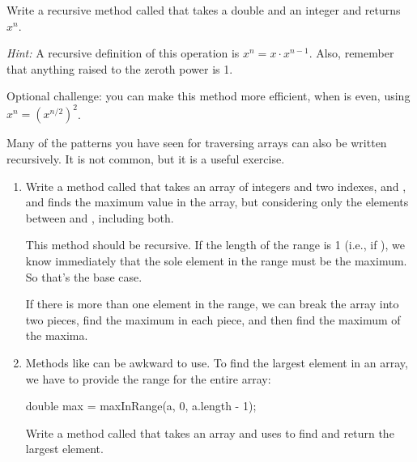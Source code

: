 \begin{exercise}  %
\label{ex.power}

Write a recursive method called  that takes a double  and an integer  and returns $x^n$.

{\em Hint:} A recursive definition of this operation is $x^n = x \cdot x^{n-1}$.
Also, remember that anything raised to the zeroth power is 1.

Optional challenge: you can make this method more efficient, when  is even, using $x^n = \left( x^{n/2} \right)^2$.

\end{exercise}


\begin{exercise}  %

Many of the patterns you have seen for traversing arrays can also be written recursively.
It is not common, but it is a useful exercise.

\begin{enumerate}

\item Write a method called  that takes an array of integers and two indexes,  and , and finds the maximum value in the array, but considering only the elements between  and , including both.

This method should be recursive.
If the length of the range is 1 (i.e., if ), we know immediately that the sole element in the range must be the maximum.
So that's the base case.

If there is more than one element in the range, we can break the array into two pieces, find the maximum in each piece, and then find the maximum of the maxima.

\item Methods like  can be awkward to use.
To find the largest element in an array, we have to provide the range for the entire array:

\begin{code}
double max = maxInRange(a, 0, a.length - 1);
\end{code}

Write a method called  that takes an array and uses  to find and return the largest element.

\end{enumerate}

\end{exercise}


